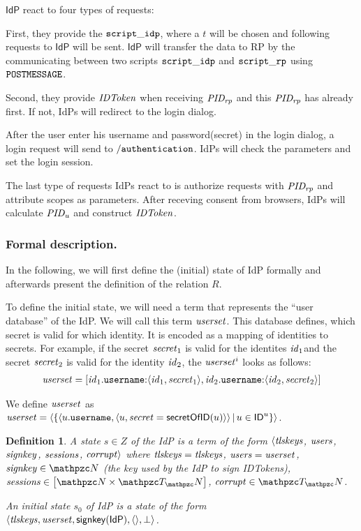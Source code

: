 \documentclass[letterpaper,onecolumn,10pt]{article}
\newtheorem{definition}{Definition}
\begin{document}
$\mathsf{IdP}$ react to four types of requests:

First, they provide the $\mathtt{script\_idp}$, where a $t$ 
will be chosen and following requests to $\mathsf{IdP}$ 
will be sent. $\mathsf{IdP}$ will transfer the data
to RP by the communicating between two scripts $\mathtt{script\_idp}$ 
and $\mathtt{script\_rp}$ using $\mathtt{POSTMESSAGE}$.

Second, they provide $\mathit{IDToken}$ when receiving $\mathit{PID_{rp}}$ and this 
$\mathit{PID_{rp}}$ has already first. If not, IdPs will redirect to the login dialog.

After the user enter his username and password(secret) in the login dialog, a login
request will send to $\mathtt{/authentication}$. IdPs will check the parameters and 
set the login session.

The last type of requests IdPs react to is authorize requests with $\mathit{PID_{rp}}$ and attribute
scopes as parameters. After receving consent from browsers, IdPs will calculate 
$\mathit{PID_{u}}$ and construct $\mathit{IDToken}$.

\subsubsection{Formal description.} In the following, we 
will first define the (initial) state of IdP formally and 
afterwards present the definition of the relation $R$.

To define the initial state, we will need a term that 
represents the ``user database'' of the IdP. We will 
call this term $\mathit{userset}$. This database defines, 
which secret is valid for which identity. It is encoded as 
a mapping of identities to secrets. For example, if the 
secret $\mathit{secret}_1$ is valid for the identites
$\mathit{id}_1$and the secret $\mathit{secret}_2$ is valid for the 
identity $\mathit{id}_2$, the $\mathit{userset}^i$ looks as follows:
\begin{align*}
\mathit{userset} = [\mathit{id}_1.\mathtt{username}{:}\langle {{}\mathit{id}_1, \mathit{secret}_1} \rangle, 
  \mathit{id}_2.\mathtt{username}{:}\langle {{}\mathit{id}_2, \mathit{secret}_2} \rangle]
\end{align*}

We define $\mathit{userset}$ as $\mathit{userset} = \langle\{\langle u.\mathtt{username},
    \langle {{}u, \mathit{secret} = \mathsf{secretOfID}(u)} \rangle\rangle\, |\, u \in \mathsf{ID}^u\}\rangle$.

\begin{definition}\label{def:initial-state-idp}
  A \emph{state $s\in Z$ of the IdP} is a term of the form
  $\langle\mathit{tlskeys}$, $\mathit{users}$, $\mathit{signkey}$,
  $\mathit{sessions}$, $\mathit{corrupt}\rangle$ where 
  $\mathit{tlskeys} = \mathit{tlskeys} $, 
  $\mathit{users} = \mathit{userset}$, 
  $\mi{signkey} \in \nonces$ 
  (the key used by the IdP to sign IDTokens),
  $\mi{sessions}\in\dict{\nonces}{\terms}$, $\mi{corrupt} \in \terms$.

  An \emph{initial state $s_0$ of IdP} is a state of the form 
  $\langle\mathit{tlskeys}, \mathit{userset}, \mathsf{signkey}(\mathsf{IdP}), \langle\rangle, \bot\rangle$.
\end{definition}
\end{document}
